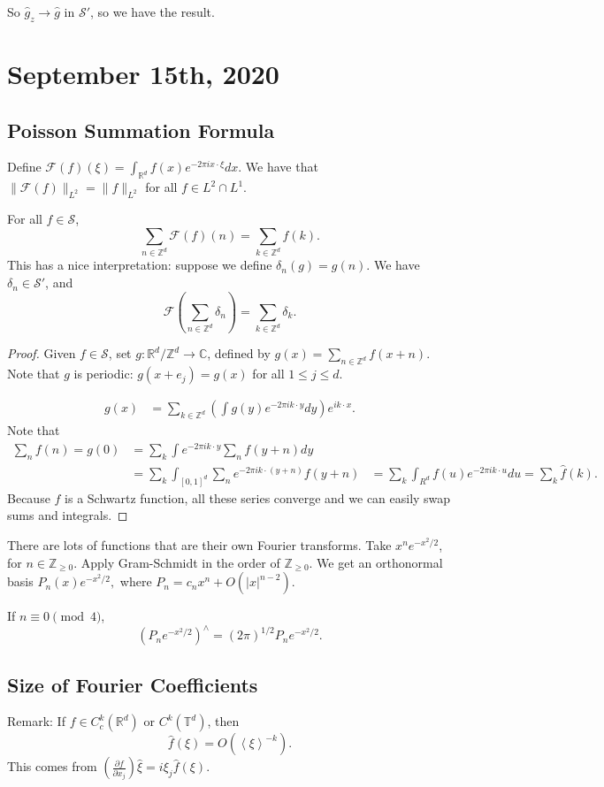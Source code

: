 \documentclass[11pt]{scrartcl}
\newcommand{\Z}{\mathbb{Z}}
\newcommand{\R}{\mathbb{R}}
\newcommand{\C}{\mathbb C}
\newcommand{\T}{\mathbb T}
\newcommand{\SRS}{\mathscr {S}}
\let \hat \widehat
\newcommand{\<}{\langle}
\renewcommand{\>}{\rangle}
\begin{document}
So $\hat{g}_z \rightarrow \hat{g}$ in $\SRS'$, so we have the result.
\pagebreak
\section{September 15th, 2020}
\subsection{Poisson Summation Formula}
Define $\mathscr{F}(f)(\xi) = \int_{\R^d} f(x)e^{-2\pi i x \cdot \xi}dx$.  We have that $\|\mathscr{F}(f)\|_{L^2} = \|f\|_{L^2}$ for all $f \in L^2 \cap L^1$.

\begin{thm} For all $f \in \SRS$, $$\sum_{n \in \Z^d} \mathscr{F}(f)(n) = \sum_{k \in \Z^d}f(k).$$
This has a nice interpretation: suppose we define $\delta_n(g) = g(n)$.  We have $\delta_n \in \SRS'$, and
$$\mathscr{F}\left (\sum_{n \in \Z^d} \delta_n\right ) = \sum_{k \in \Z^d} \delta_k.$$
\end{thm}
\begin{proof}
Given $f \in \SRS$, set $g: \R^d/\Z^d \rightarrow \C$, defined by $g(x) = \sum_{n \in \Z^d} f(x+n)$.  Note that $g$ is periodic: $g(x + e_j) = g(x)$ for all $1 \le j \le d$.  

\begin{align*}
g(x) &= \sum_{k \in \Z^d} \left(\int g(y) e^{-2\pi i k \cdot y}dy \right ) e^{ik \cdot x}.
\end{align*}
Note that 
\begin{align*}
 \sum_{n} f(n) = g(0) &= \sum_{k} \int e^{-2\pi i k \cdot y} \sum_{n} f(y+n) dy \\
 &= \sum_k \int_{[0, 1]^d} \sum _n e^{-2\pi i k \cdot (y + n)} f(y+n)
 &= \sum_{k} \int_{R^d} f(u)e^{-2\pi i k \cdot u}du = \sum_{k} \hat{f}(k).
\end{align*}
Because $f$ is a Schwartz function, all these series converge and we can easily swap sums and integrals.
\end{proof}

\begin{example} There are lots of functions that are their own Fourier transforms.  Take $x^n e^{-x^2/2}$, for $n \in \Z_{\ge 0}$.  Apply Gram-Schmidt in the order of $\Z_{\ge 0}$.  We get an orthonormal basis $P_n(x)e^{-x^2/2},$ where $P_n = c_nx^n + O(|x|^{n-2}).$

If $n \equiv 0 \pmod 4$, $$(P_n e^{-x^2/2})^\wedge = (2\pi)^{1/2}P_n e^{-x^2/2}.$$
\end{example}
\subsection{Size of Fourier Coefficients}
Remark:  If $f \in C_c^k(\R^d)$ or $C^k(\T^d)$, then $$\hat{f}(\xi) = O(\left <\xi\right >^{-k}).$$
This comes from $\left (\frac{\partial f}{\partial x_j}\right )\hat{\xi} = i \xi_j \hat{f}(\xi)$.
\end{document}
